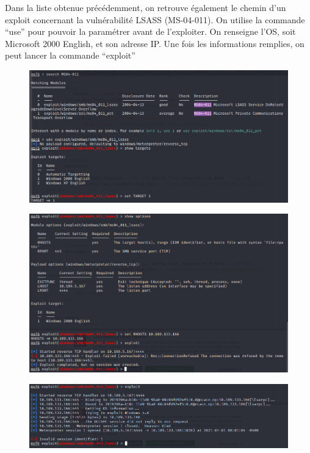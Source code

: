 \documentclass[12pt, oneside]{article}
\begin{document}
Dans la liste obtenue précédemment, on retrouve également le chemin d’un exploit concernant la vulnérabilité LSASS (MS-04-011). On utilise la commande “use” pour pouvoir la paramétrer avant de l’exploiter. On renseigne l’OS, soit Microsoft 2000 English, et son adresse IP. Une fois les informations remplies, on peut lancer la commande “exploit”
\begin{figure}[H]
\centering
\includegraphics[scale=0.4]{Image6}
\end{figure}
\begin{figure}[H]
\centering
\includegraphics[scale=0.4]{Image7}
\end{figure}
\begin{figure}[H]
\centering
\includegraphics[scale=0.4]{Image8}
\end{figure}
\end{document}
